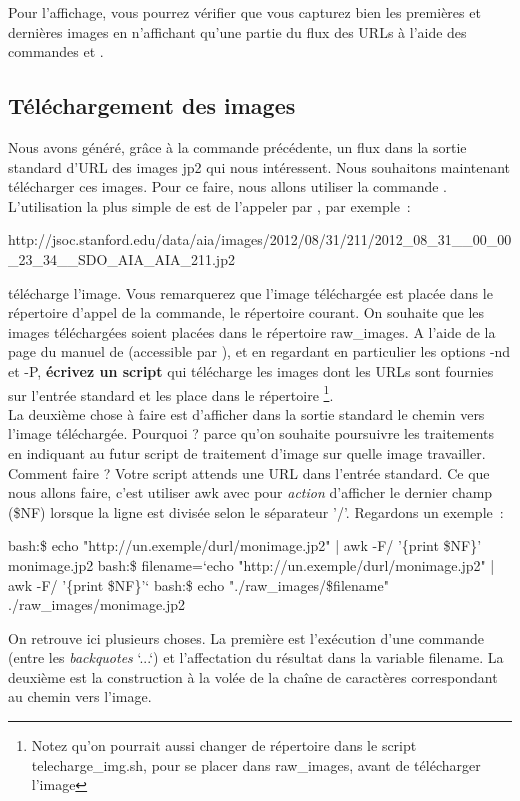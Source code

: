 Pour l'affichage, vous pourrez vérifier que vous capturez bien les premières et dernières images en n'affichant qu'une partie du flux des URLs à l'aide des commandes \head et \tail.

\subsection{Téléchargement des images}

Nous avons généré, grâce à la commande précédente, un flux dans la sortie standard d'URL des images jp2 qui nous intéressent. Nous souhaitons maintenant télécharger ces images. Pour ce faire, nous allons utiliser la commande . L'utilisation la plus simple de  est de l'appeler par , par exemple~:
\begin{center}
\wget http://jsoc.stanford.edu/data/aia/images/2012/08/31/211/2012\_08\_31\_\_00\_00\_23\_34\_\_SDO\_AIA\_AIA\_211.jp2
\end{center}
télécharge l'image. Vous remarquerez que l'image téléchargée est placée dans le répertoire d'appel de la commande, le répertoire courant. On souhaite que les images téléchargées soient placées dans le répertoire raw\_images. A l'aide de la page du manuel de \wget (accessible par ), et en regardant en particulier les options -nd et -P, \textbf{écrivez un script}  qui télécharge les images dont les URLs sont fournies sur l'entrée standard et les place dans le répertoire \footnote{Notez qu'on pourrait aussi changer de répertoire dans le script telecharge\_img.sh, pour se placer dans raw\_images, avant de télécharger l'image}.\\

La deuxième chose à faire est d'afficher dans la sortie standard le chemin vers l'image téléchargée. Pourquoi ? parce qu'on souhaite poursuivre les traitements en indiquant au futur script de traitement d'image sur quelle image travailler. Comment faire ? Votre script  attends une URL dans l'entrée standard. Ce que nous allons faire, c'est utiliser awk avec pour \emph{action} d'afficher le dernier champ (\$NF) lorsque la ligne est divisée selon le séparateur '/'. Regardons un exemple~:
\begin{exempleResultat}
bash:\$ echo "http://un.exemple/durl/monimage.jp2" | awk -F/ '\{print \$NF\}'
monimage.jp2
bash:\$ filename=`echo "http://un.exemple/durl/monimage.jp2" | awk -F/ '\{print \$NF\}'`
bash:\$ echo "./raw\_images/\$filename"
./raw\_images/monimage.jp2
\end{exempleResultat}
On retrouve ici plusieurs choses. La première est l'exécution d'une commande (entre les \emph{backquotes} `...`) et l'affectation du résultat dans la variable filename. La deuxième est la construction à la volée de la chaîne de caractères correspondant au chemin vers l'image.\\

